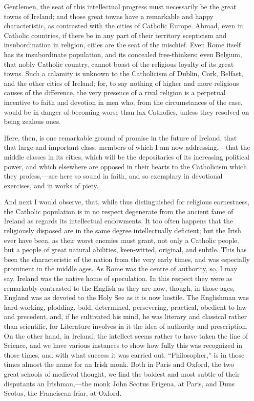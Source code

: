 Gentlemen, the seat of this intellectual progress must necessarily
be the great towns of Ireland; and those great towns have a remarkable
and happy characteristic, as contrasted with the cities of Catholic
Europe. Abroad, even in Catholic countries, if there be in any part of
their territory scepticism and insubordination in religion, cities are
the seat of the mischief. Even Rome itself has its insubordinate
population, and its concealed free-thinkers; even Belgium, that nobly
Catholic country, cannot boast of the religious loyalty of its great
towns. Such a calamity is unknown to the Catholicism of Dublin, Cork,
Belfast, and the other cities of Ireland; for, to say nothing of
higher and more religious causes of the difference, the very presence
of a rival religion is a perpetual incentive to faith and devotion in
men who, from the circumstances of the case, would be in danger of
becoming worse than lax Catholics, unless they resolved on being
zealous ones.

Here, then, is one remarkable ground of promise in the future of
Ireland, that that large and important class, members of which I am
now addressing,—that the middle classes in its cities, which will be
the depositaries of its increasing political power, and which
elsewhere are opposed in their hearts to the Catholicism which they
profess,—are here so sound in faith, and so exemplary in devotional
exercises, and in works of piety.

And next I would observe, that, while thus distinguished for
religious earnestness, the Catholic population is in no respect
degenerate from the ancient fame of Ireland as regards its
intellectual endowments. It too often happens that the religiously
disposed are in the same degree intellectually deficient; but the
Irish ever have been, as their worst enemies must grant, not only a
Catholic people, but a people of great natural abilities, keen-witted,
original, and subtle. This has been the characteristic of the nation
from the very early times, and was especially prominent in the middle
ages. As Rome was the centre of authority, so, I may say, Ireland was
the native home of speculation. In this respect they were as
remarkably contrasted to the English as they are now, though, in those
ages, England was as devoted to the Holy See as it is now hostile. The
Englishman was hard-working, plodding, bold, determined, persevering,
practical, obedient to law and precedent, and, if he cultivated his
mind, he was literary and classical rather than scientific, for
Literature involves in it the idea of authority and prescription. On
the other hand, in Ireland, the intellect seems rather to have taken
the line of Science, and we have various instances to show how fully
this was recognized in those times, and with what success it was
carried out. ``Philosopher,'' is in those times almost the
name for an Irish monk. Both in Paris and Oxford, the two great
schools of medieval thought, we find the boldest and most subtle of
their disputants an Irishman,—the monk John Scotus Erigena, at
Paris, and Duns Scotus, the Franciscan friar, at Oxford.

